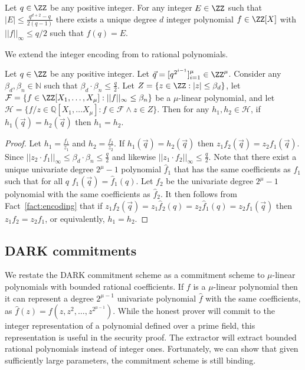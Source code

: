 \begin{fact}
\label{fact:encoding}
Let $q \in \ZZ$ be any positive integer. For any integer $E \in \ZZ$ such that $|E|\leq \frac{q^{d+2} - q}{2(q-1)}$ there exists a unique degree $d$ integer polynomial $f \in \ZZ[X]$ with $||f||_\infty \leq q/2$ such that $f(q) = E$. 
\end{fact} 

We extend the integer encoding from  to rational polynomials.
\begin{lemma}
\label{lem:encoding}
Let $q \in \ZZ$ be any positive integer. Let $\vec{q}=[q^{2^{i-1}}]_{i=1}^\mu \in \ZZ^\mu$. Consider any $\beta_d, \beta_n \in \mathbb{N}$ such that $\beta_d \cdot \beta_n\leq \frac{q}{2}$. Let $Z = \{z \in \ZZ: |z| \leq \beta_d \}$, let $\mathcal{F} = \{ f \in \ZZ[X_1,\dots,X_\mu]: ||f||_\infty \leq \beta_n\}$ be a $\mu$-linear polynomial, and let $\mathcal{H} = \{f/z \in \mathbb{Q}[X_1,\dots X_\mu]: f \in \mathcal{F} \wedge z \in Z \}$. Then for any $h_1, h_2 \in \mathcal{H}$,  if $h_1(\vec{q}) = h_2(\vec{q})$ then $h_1 = h_2$. 
\end{lemma}
\begin{proof}
Let $h_1 = \frac{f_1}{z_1}$ and $h_2 = \frac{f_2}{z_2}$. If $h_1(\vec{q}) = h_2(\vec{q})$ then $z_1 f_2(\vec{q}) = z_2 f_1(\vec{q})$. Since $||z_2 \cdot f_1||_\infty \leq \beta_d \cdot \beta_n \leq \frac{q}{2}$ and  likewise $||z_1\cdot f_2||_\infty \leq \frac{q}{2}$. Note that there exist a unique univariate degree $2^\mu-1$ polynomial $\hat{f}_1$ that has the same coefficients as $f_1$ such that for all $q$ $f_1(\vec{q})=\hat{f}_1(q)$. Let $f_2$ be the univariate degree $2^\mu-1$ polynomial with the same coefficients as $\hat{f}_2$. It then follows from Fact~\ref{fact:encoding} that if $z_1 f_2(\vec{q})=z_1\hat{f}_2(q) = z_2 \hat{f}_1(q)= z_2 f_1(\vec{q})$ then $z_1 f_2 = z_2 f_1$, or equivalently, $h_1 = h_2$.
\end{proof}


\subsection{DARK commitments} 
We restate the DARK commitment scheme as a commitment scheme to $\mu$-linear polynomials with bounded rational coefficients. If $f$ is a $\mu$-linear polynomial then it can represent a degree $2^{\mu-1}$ univariate polynomial $\hat{f}$ with the same coefficients, as $\hat{f}(z)=f(z,z^2,\dots,z^{2^{\mu-1}})$. 
While the honest prover will commit to the integer representation of a polynomial defined over a prime field, this representation is useful in the security proof. The extractor will extract bounded rational polynomials instead of integer ones. Fortunately, we can show that given sufficiently large parameters, the commitment scheme is still binding.

